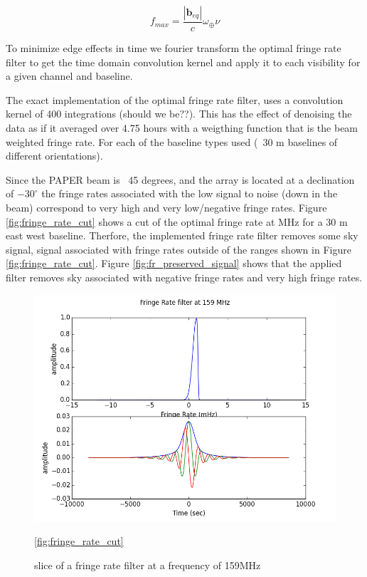 \documentclass[twocolumn,numberedappendix]{emulateapj}
\begin{document}
\begin{equation}
    f_{max} = \frac{|\mathbf{b}_{eq}|}{c}\omega_{\oplus}\nu
\end{equation}


To minimize edge effects in time we fourier transform the optimal fringe rate
filter to get the time domain convolution kernel and apply it to each visibility for a
given channel and baseline. 

The exact implementation of the optimal fringe rate filter, uses a convolution
kernel of 400 integrations (should we be??). This has the effect of denoising the data as if it
averaged over 4.75 hours with a weigthing function that is the beam weighted
fringe rate. For each of the baseline types used (~30 m baselines of different
orientations).

Since the PAPER beam is ~45 degrees, and the array is located at a declination
of $-30^{\circ}$ the fringe rates associated with the low signal to noise (down
in the beam) correspond to very high and very low/negative fringe rates. Figure
\ref{fig:fringe_rate_cut} shows a cut of the optimal fringe rate at MHz for a 30
m east west baseline. Therfore, the implemented fringe rate filter removes some
sky signal, signal associated with fringe rates outside of the ranges shown in
Figure \ref{fig:fringe_rate_cut}. Figure \ref{fig:fr_preserved_signal} shows
that the applied filter removes sky associated with negative fringe rates and
very high fringe rates. 

\begin{figure}
\centering
\includegraphics[width=\columnwidth]{plots/fr_filter_slice.png}
\caption{slice of a fringe rate filter at a frequency of 159MHz}
\ref{fig:fringe_rate_cut}
\end{figure}
\end{document}
